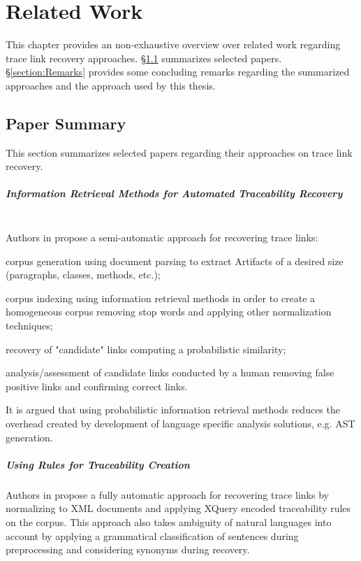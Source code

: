 \chapter{Related Work}
\label{chapter:RelatedWork}
This chapter provides an non-exhaustive overview over related work regarding trace link recovery approaches.
§\ref{section:PaperSummary} summarizes selected papers.
§\ref{section:Remarks} provides some concluding remarks regarding the summarized approaches and the approach used by this thesis.

\section{Paper Summary}
\label{section:PaperSummary}
This section summarizes selected papers regarding their approaches on trace link recovery.

\paragraph*{Information Retrieval Methods for Automated Traceability Recovery}
~\\Authors in \cite{DeLucia2012} 
propose a semi-automatic approach for recovering trace links: 
\begin{enumerate*}[label={(\roman*)}]
\item
corpus generation using document parsing to extract \glspl{Artifact} of a desired size (paragraphs, classes, methods, etc.);
\item
corpus indexing using information retrieval methods in order to create a homogeneous corpus removing stop words and applying other normalization techniques;
\item
recovery of "candidate" links computing a probabilistic similarity;
\item
analysis/assessment of candidate links conducted by a human removing false positive links and confirming correct links.
\end{enumerate*}
It is argued that using probabilistic information retrieval methods reduces the  overhead created by development of language specific analysis solutions, e.g. \gls{AST} generation.

\paragraph*{Using Rules for Traceability Creation} 
Authors in \cite{Zisman2012}
propose a fully automatic approach for recovering trace links by normalizing to \gls{XML} documents and applying XQuery encoded traceability rules on the corpus.
This approach also takes ambiguity of natural languages into account by applying a grammatical classification of sentences during preprocessing and considering synonyms during recovery.

